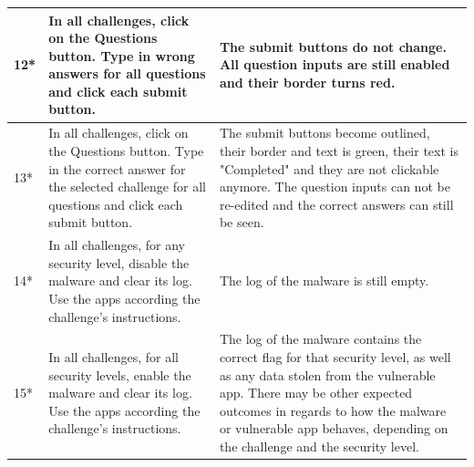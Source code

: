 \begin{center}
\begin{longtable}{|p{0.4cm} |p{5.2cm} |p{7.4cm} |}
         \hline
         12* & In all challenges, click on the Questions button. Type in wrong answers for all questions and click each submit button. & The submit buttons do not change. All question inputs are still enabled and their border turns red. \\
         \hline
         13* & In all challenges, click on the Questions button. Type in the correct answer for the selected challenge for all questions and click each submit button. & The submit buttons become outlined, their border and text is green, their text is "Completed" and they are not clickable anymore. The question inputs can not be re-edited and the correct answers can still be seen. \\
         \hline
         14* & In all challenges, for any security level, disable the malware and clear its log. Use the apps according the challenge's instructions. & The log of the malware is still empty. \\
         \hline
         15* & In all challenges, for all security levels, enable the malware and clear its log. Use the apps according the challenge's instructions. & The log of the malware contains the correct flag for that security level, as well as any data stolen from the vulnerable app. There may be other expected outcomes in regards to how the malware or vulnerable app behaves, depending on the challenge and the security level.\\
         \hline

        \end{longtable}
    \end{center}
    